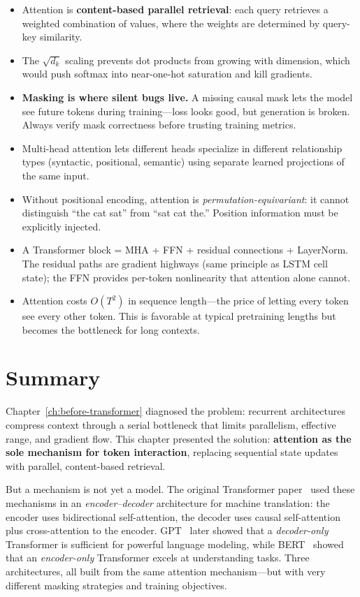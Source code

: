 \begin{takeaways}
\begin{itemize}[leftmargin=1.2em, itemsep=4pt]
  \item Attention is \textbf{content-based parallel retrieval}: each query retrieves a weighted combination of values, where the weights are determined by query-key similarity.
  \item The $\sqrt{d_k}$ scaling prevents dot products from growing with dimension, which would push softmax into near-one-hot saturation and kill gradients.
  \item \textbf{Masking is where silent bugs live.} A missing causal mask lets the model see future tokens during training—loss looks good, but generation is broken. Always verify mask correctness before trusting training metrics.
  \item Multi-head attention lets different heads specialize in different relationship types (syntactic, positional, semantic) using separate learned projections of the same input.
  \item Without positional encoding, attention is \emph{permutation-equivariant}: it cannot distinguish ``the cat sat'' from ``sat cat the.'' Position information must be explicitly injected.
  \item A Transformer block = MHA + FFN + residual connections + LayerNorm. The residual paths are gradient highways (same principle as LSTM cell state); the FFN provides per-token nonlinearity that attention alone cannot.
  \item Attention costs $O(T^2)$ in sequence length—the price of letting every token see every other token. This is favorable at typical pretraining lengths but becomes the bottleneck for long contexts.
\end{itemize}
\end{takeaways}

\section{Summary}

Chapter~\ref{ch:before-transformer} diagnosed the problem: recurrent architectures compress context through a serial bottleneck that limits parallelism, effective range, and gradient flow. This chapter presented the solution: \textbf{attention as the sole mechanism for token interaction}, replacing sequential state updates with parallel, content-based retrieval.

But a mechanism is not yet a model. The original Transformer paper~\cite{vaswani2017attention} used these mechanisms in an \emph{encoder--decoder} architecture for machine translation: the encoder uses bidirectional self-attention, the decoder uses causal self-attention plus cross-attention to the encoder. GPT~\cite{radford2018improving} later showed that a \emph{decoder-only} Transformer is sufficient for powerful language modeling, while BERT~\cite{devlin2019bert} showed that an \emph{encoder-only} Transformer excels at understanding tasks. Three architectures, all built from the same attention mechanism---but with very different masking strategies and training objectives.

